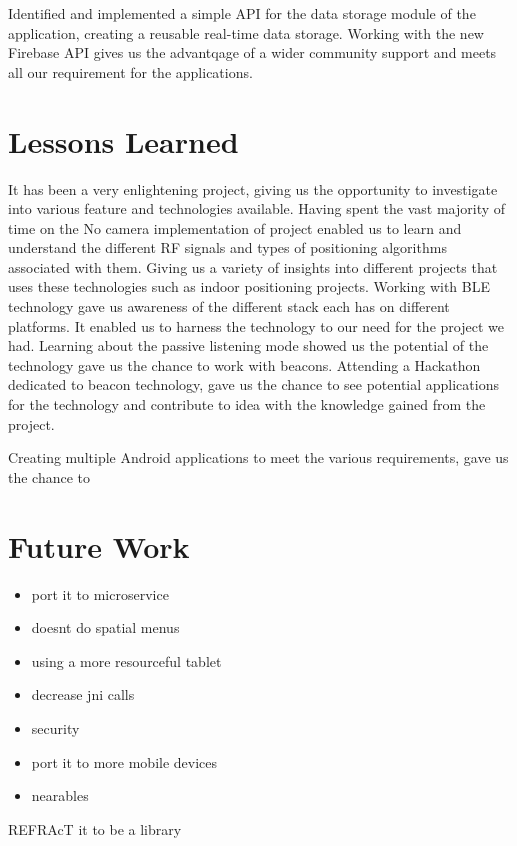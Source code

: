 Identified and implemented a simple API for the data storage module of the application, creating a reusable real-time data storage. Working with the new Firebase API gives us the advantqage of a wider community support and meets all our requirement for the applications.

\section{Lessons Learned}

It has been a very enlightening project, giving us the opportunity to investigate into various feature and technologies available. Having spent the vast majority of time on the No camera implementation of project enabled us to learn and understand the different RF signals and types of positioning algorithms associated with them. Giving us a variety of insights into different projects that uses these technologies such as indoor positioning projects. 
Working with BLE technology gave us awareness of the different stack each has on different platforms. It enabled us to harness the technology to our need for the project we had. Learning about the passive listening mode showed us the potential of the technology gave us the chance to work with beacons. Attending a Hackathon dedicated to beacon technology, gave us the chance to see potential applications for the technology and contribute to idea with the knowledge gained from the project.

Creating multiple Android applications to meet the various requirements, gave us the chance to 
\section{Future Work}
\begin{itemize}
\item port it to microservice
\item doesnt do spatial menus
\item using a more resourceful tablet
\item decrease jni calls
\item security
\item port it to more mobile devices
\item nearables
\end{itemize}

REFRAcT it to be a library 